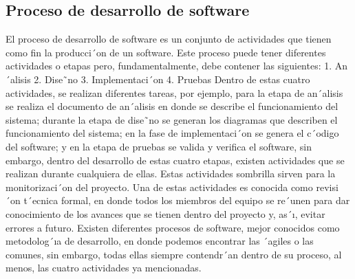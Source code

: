 \subsection{Proceso de desarrollo de software}
El proceso de desarrollo de software es un conjunto de actividades que tienen como fin la producci´on
de un software. Este proceso puede tener diferentes actividades o etapas pero, fundamentalmente, debe
contener las siguientes:
1. An´alisis
2. Dise˜no
3. Implementaci´on
4. Pruebas
Dentro de estas cuatro actividades, se realizan diferentes tareas, por ejemplo, para la etapa de
an´alisis se realiza el documento de an´alisis en donde se describe el funcionamiento del sistema; durante
la etapa de dise˜no se generan los diagramas que describen el funcionamiento del sistema; en la fase
de implementaci´on se genera el c´odigo del software; y en la etapa de pruebas se valida y verifica el
software, sin embargo, dentro del desarrollo de estas cuatro etapas, existen actividades que se realizan
durante cualquiera de ellas. Estas actividades sombrilla sirven para la monitorizaci´on del proyecto.
Una de estas actividades es conocida como revisi´on t´ecnica formal, en donde todos los miembros del
equipo se re´unen para dar conocimiento de los avances que se tienen dentro del proyecto y, as´ı, evitar
errores a futuro.
Existen diferentes procesos de software, mejor conocidos como metodolog´ıa de desarrollo, en donde
podemos encontrar las ´agiles o las comunes, sin embargo, todas ellas siempre contendr´an dentro de su
proceso, al menos, las cuatro actividades ya mencionadas.